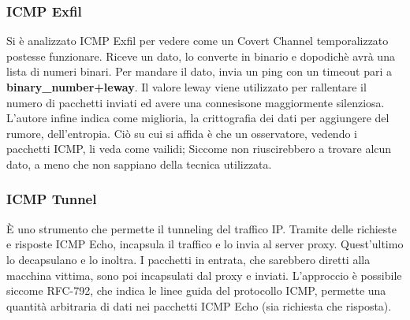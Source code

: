 \begin{frame}
\frametitle{ICMP Exfil}
Si è analizzato ICMP Exfil per vedere come un Covert Channel temporalizzato postesse funzionare. 
Riceve un dato, lo converte in binario e dopodichè avrà una lista di numeri binari. 
Per mandare il dato, invia un ping con un timeout pari a \textbf{binary\_number+leway}. 
Il valore leway viene utilizzato per rallentare il numero di pacchetti inviati ed avere una connesisone maggiormente silenziosa. 
L'autore infine indica come miglioria, la crittografia dei dati per aggiungere del rumore, dell'entropia. 
\vspace{1ex} \newline 
Ciò su cui si affida è che un osservatore, vedendo i pacchetti ICMP, li veda come vailidi; 
Siccome non riuscirebbero a trovare alcun dato, a meno che non sappiano della tecnica utilizzata. 
\end{frame}
%
\begin{frame}
\frametitle{ICMP Tunnel}
\MakeUppercase{è} uno strumento che permette il tunneling del traffico IP. 
Tramite delle richieste e risposte ICMP Echo, incapsula il traffico e lo invia al server proxy. 
Quest'ultimo lo decapsulano e lo inoltra. 
I pacchetti in entrata, che sarebbero diretti alla macchina vittima, sono poi incapsulati dal proxy e inviati. 
L'approccio è possibile siccome RFC-792, che indica le linee guida del protocollo ICMP, permette una quantità arbitraria di dati nei pacchetti ICMP Echo (sia richiesta che risposta). 
\end{frame} 